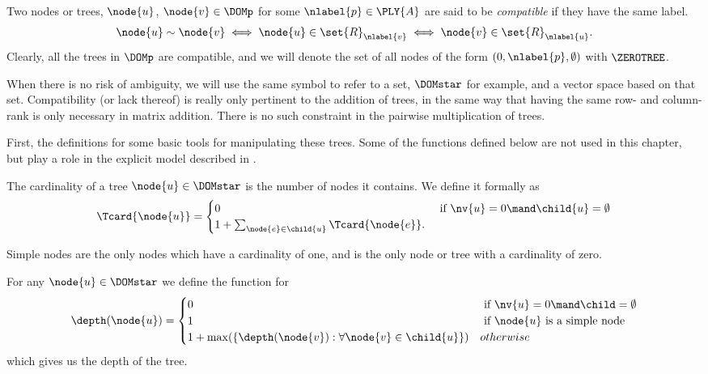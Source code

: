 \begin{definition}\label{compatibility}
Two nodes or trees, $\node{u}$, $\node{v} \in \DOMp$ for 
some $\nlabel{p} \in \PLY{A}$ are said to be
\emph{compatible\/} if they have the same label.
\[
  \node{u} \sim \node{v} \iff  
  \node{u}\in\set{R}_{\nlabel{v}} \iff 
  \node{v}\in\set{R}_{\nlabel{u}}.
\]
Clearly, all the trees in $\DOMp$ are compatible, and we will denote the
set of all nodes of the form $(0, \nlabel{p}, \emptyset)$ with $\ZEROTREE$.
\end{definition}

When there is no risk of ambiguity, we will use the same symbol to
refer to a set, $\DOMstar$ for example, and a vector space based on that
set. Compatibility (or lack thereof) is really only pertinent to the
addition of trees, in the same way that having the same row- and
column-rank is only necessary in matrix addition.  There is no such
constraint in the pairwise multiplication of trees.

First, the definitions for some basic tools for manipulating these
trees. Some of the functions defined below are not used in this chapter, but
play a role in the explicit model described in \Cfive.  

\begin{definition}\label{Tcard}
  The cardinality of a tree $\node{u}\in\DOMstar$ is the number of nodes it contains. We
  define it formally as
  \begin{align*}
  \Tcard{\node{u}} = \begin{cases}
    0 & \text{ if } \nv{u} = 0 \mand \child{u} = \emptyset\\
    1 + \sum_{\node{e}\in\child{u}} \Tcard{\node{e}}.
    \end{cases}
  \end{align*}

Simple nodes are the only nodes which have a cardinality of one, and \tzerotree is the only node or tree with a
cardinality of zero.
\end{definition}

\begin{definition}\label{depth}
  For any \(\node{u} \in \DOMstar\) we define the function for 
  \begin{align*} 
    \depth(\node{u}) = \begin{cases}
      0 & \text{ if } \nv{u} = 0 \mand \child = \emptyset\\
      1 & \text{ if } \node{u} \text{ is a simple node} \\
      1 + \max(\lbrace\depth(\node{v}):\forall \node{v} \in \child{u}\rbrace) & otherwise
    \end{cases}
  \end{align*}
  which gives us the depth of the tree.
\end{definition}

